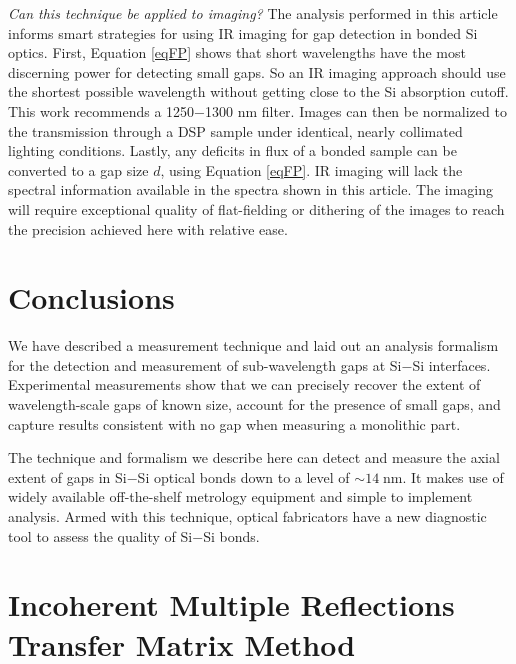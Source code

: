 \documentclass[osajnl,preprint,showpacs,superscriptaddress,12pt]{revtex4-1} %
\begin{document}
\emph{Can this technique be applied to imaging?}  The analysis performed in this article informs smart strategies for using IR imaging for gap detection in bonded Si optics.  First, Equation \ref{eqFP} shows that short wavelengths have the most discerning power for detecting small gaps.  So an IR imaging approach should use the shortest possible wavelength without getting close to the Si absorption cutoff.  This work recommends a 1250$-$1300 nm filter.  Images can then be normalized to the transmission through a DSP sample under identical, nearly collimated lighting conditions.  Lastly, any deficits in flux of a bonded sample can be converted to a gap size $d$, using Equation \ref{eqFP}.  IR imaging will lack the spectral information available in the spectra shown in this article.  The imaging will require exceptional quality of flat-fielding or dithering of the images to reach the precision achieved here with relative ease.  

\section{Conclusions}
We have described a measurement technique and laid out an analysis formalism for the detection and measurement of sub-wavelength gaps at Si$-$Si interfaces.  Experimental measurements show that we can precisely recover the extent of wavelength-scale gaps of known size, account for the presence of small gaps, and capture results consistent with no gap when measuring a monolithic part.

The technique and formalism we describe here can detect and measure the axial extent of gaps in Si$-$Si optical bonds down to a level of $\sim14\;$nm.  It makes use of widely available off-the-shelf metrology equipment and simple to implement analysis.  Armed with this technique, optical fabricators have a new diagnostic tool to assess the quality of Si$-$Si bonds.


\appendix

\section{Incoherent Multiple Reflections Transfer Matrix Method}
\label{sec:Append-IMRTMM}
\end{document}
